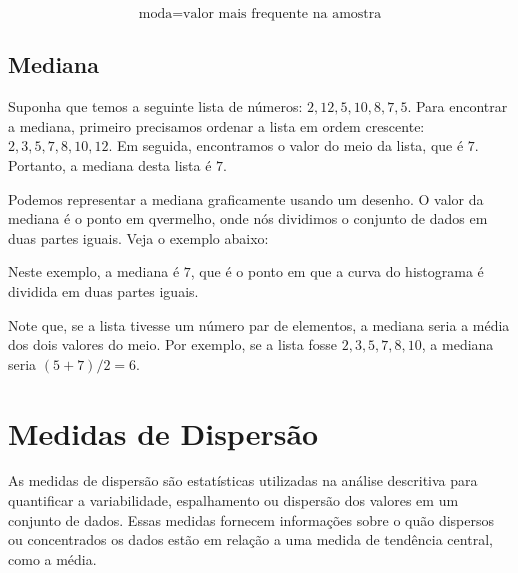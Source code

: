 \[
\text{moda} = \text{valor mais frequente na amostra}
\]

\subsection{Mediana}

Suponha que temos a seguinte lista de números: $2, 12, 5, 10, 8, 7, 5$. Para encontrar a mediana, primeiro precisamos ordenar a lista em ordem crescente: $2, 3, 5, 7, 8, 10, 12$. Em seguida, encontramos o valor do meio da lista, que é $7$. Portanto, a mediana desta lista é $7$.

Podemos representar a mediana graficamente usando um desenho. O valor da mediana é o ponto em qvermelho, onde nós dividimos o conjunto de dados em duas partes iguais. Veja o exemplo abaixo:

\begin{center}
\end{center}
    
    

Neste exemplo, a mediana é $7$, que é o ponto em que a curva do histograma é dividida em duas partes iguais.

Note que, se a lista tivesse um número par de elementos, a mediana seria a média dos dois valores do meio. Por exemplo, se a lista fosse $2, 3, 5, 7, 8, 10$, a mediana seria $(5+7)/2 = 6$.

\section{Medidas de Dispersão}

As medidas de dispersão são estatísticas utilizadas na análise descritiva para quantificar a variabilidade, espalhamento ou dispersão dos valores em um conjunto de dados. Essas medidas fornecem informações sobre o quão dispersos ou concentrados os dados estão em relação a uma medida de tendência central, como a média.

